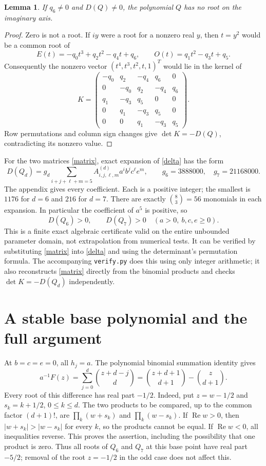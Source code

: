 \documentclass[11pt]{article}
\newtheorem{lemma}{Lemma}
\newcommand{\Rea}{\operatorname{Re}}
\begin{document}
\begin{lemma}\label{axis}
If $q_6\ne0$ and $D(Q)\ne0$, the polynomial $Q$ has no root on the
imaginary axis.
\end{lemma}
\begin{proof}
Zero is not a root. If $iy$ were a root for a nonzero real $y$, then
$t=y^2$ would be a common root of
\[
 E(t)=-q_0t^3+q_2t^2-q_4t+q_6,\qquad
 O(t)=q_1t^2-q_3t+q_5.
\]
Consequently the nonzero vector $(t^4,t^3,t^2,t,1)^T$ would lie in the
kernel of
\[
 K=\begin{pmatrix}
 -q_0&q_2&-q_4&q_6&0\\0&-q_0&q_2&-q_4&q_6\\
 q_1&-q_3&q_5&0&0\\0&q_1&-q_3&q_5&0\\0&0&q_1&-q_3&q_5
 \end{pmatrix}.
\]
Row permutations and column sign changes give $\det K=-D(Q)$,
contradicting its nonzero value.
\end{proof}

For the two matrices \eqref{matrix}, exact expansion of \eqref{delta}
has the form
\begin{equation}\label{certificate}
 D(Q_d)=g_d\sum_{i+j+\ell+m=5} A^{(d)}_{i,j,\ell,m}
              a^i b^j c^\ell e^m,
 \qquad g_6=3888000,\quad g_7=21168000.
\end{equation}
The appendix gives every coefficient. Each is a positive integer;
the smallest is $1176$ for $d=6$ and $216$ for $d=7$.
There are exactly $\binom{8}{3}=56$ monomials in each expansion.
In particular the coefficient of $a^5$ is positive, so
\begin{equation}\label{pos}
 D(Q_6)>0,\qquad D(Q_7)>0
 \quad(a>0,\ b,c,e\ge0).
\end{equation}
This is a finite exact algebraic certificate valid on the entire
unbounded parameter domain, not extrapolation from numerical tests.
It can be verified by substituting \eqref{matrix} into \eqref{delta}
and using the determinant's permutation formula. The accompanying
\texttt{verify.py} does this using only integer arithmetic; it also
reconstructs \eqref{matrix} directly from the binomial products and
checks $\det K=-D(Q_d)$ independently.

\section*{A stable base polynomial and the full argument}
At $b=c=e=0$, all $h_j=a$. The polynomial binomial summation identity gives
\[
 a^{-1}F(z)=\sum_{j=0}^d\binom{z+d-j}{d}
 =\binom{z+d+1}{d+1}-\binom{z}{d+1}.
\]
Every root of this difference has real part $-1/2$. Indeed, put
$z=w-1/2$ and $s_k=k+1/2$, $0\le k\le d$.
The two products to be compared, up to the common factor $(d+1)!$,
are $\prod_k(w+s_k)$ and $\prod_k(w-s_k)$. If $\Rea w>0$, then
$|w+s_k|>|w-s_k|$ for every $k$, so the products cannot be equal.
If $\Rea w<0$, all inequalities reverse. This proves the assertion,
including the possibility that one product is zero.
Thus all roots of $Q_6$ and $Q_7$ at this base point have real part
$-5/2$; removal of the root $z=-1/2$ in the odd case does not affect this.
\end{document}
